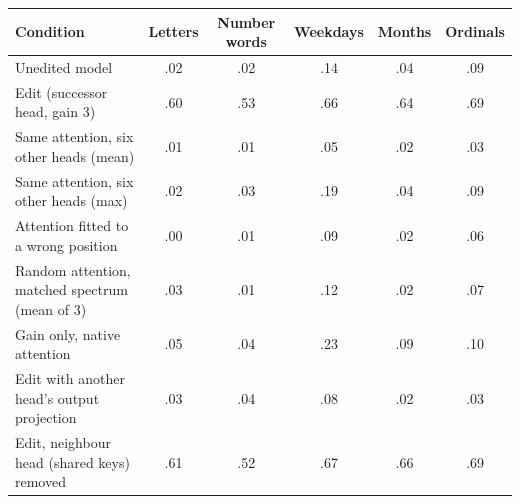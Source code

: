 \begin{tabular}{lccccc}
\toprule
Condition & Letters & Number words & Weekdays & Months & Ordinals \\
\midrule
Unedited model & .02 & .02 & .14 & .04 & .09 \\
Edit (successor head, gain 3) & .60 & .53 & .66 & .64 & .69 \\
\midrule
Same attention, six other heads (mean) & .01 & .01 & .05 & .02 & .03 \\
Same attention, six other heads (max) & .02 & .03 & .19 & .04 & .09 \\
Attention fitted to a wrong position & .00 & .01 & .09 & .02 & .06 \\
Random attention, matched spectrum (mean of 3) & .03 & .01 & .12 & .02 & .07 \\
Gain only, native attention & .05 & .04 & .23 & .09 & .10 \\
Edit with another head's output projection & .03 & .04 & .08 & .02 & .03 \\
Edit, neighbour head (shared keys) removed & .61 & .52 & .67 & .66 & .69 \\
\bottomrule
\end{tabular}
